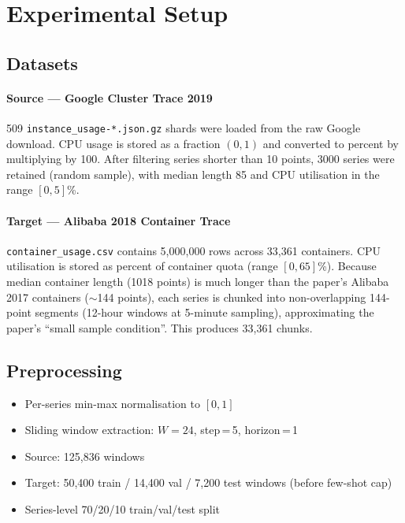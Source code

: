 \documentclass[12pt,a4paper]{article}
\begin{document}
\section{Experimental Setup}

\subsection{Datasets}

\paragraph{Source — Google Cluster Trace 2019}
509 \texttt{instance\_usage-*.json.gz} shards were loaded from the raw Google
download.  CPU usage is stored as a fraction $(0, 1)$ and converted to percent
by multiplying by 100.  After filtering series shorter than 10 points, 3000 series
were retained (random sample), with median length 85 and CPU utilisation in the
range $[0, 5]$\%.

\paragraph{Target — Alibaba 2018 Container Trace}
\texttt{container\_usage.csv} contains 5,000,000 rows across 33,361 containers.
CPU utilisation is stored as percent of container quota (range $[0, 65]$\%).
Because median container length (1018 points) is much longer than the paper's
Alibaba 2017 containers ($\sim$144 points), each series is chunked into
non-overlapping 144-point segments (12-hour windows at 5-minute sampling),
approximating the paper's ``small sample condition''.  This produces 33,361 chunks.

\subsection{Preprocessing}

\begin{itemize}
    \item Per-series min-max normalisation to $[0, 1]$
    \item Sliding window extraction: $W = 24$, step\,=\,5, horizon\,=\,1
    \item Source: 125,836 windows
    \item Target: 50,400 train / 14,400 val / 7,200 test windows (before few-shot cap)
    \item Series-level 70/20/10 train/val/test split
\end{itemize}
\end{document}
